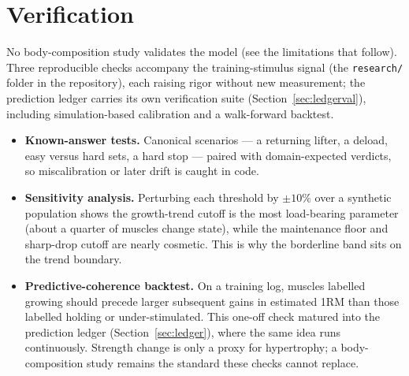 \documentclass[11pt,a4paper]{article}
\begin{document}
\section{Verification}\label{sec:verification}
No body-composition study validates the model (see the limitations that follow). Three reproducible checks accompany the training-stimulus signal (the \texttt{research/} folder in the repository), each raising rigor without new measurement; the prediction ledger carries its own verification suite (Section~\ref{sec:ledgerval}), including simulation-based calibration and a walk-forward backtest.
\begin{itemize}[leftmargin=*]
\item \textbf{Known-answer tests.} Canonical scenarios --- a returning lifter, a deload, easy versus hard sets, a hard stop --- paired with domain-expected verdicts, so miscalibration or later drift is caught in code.
\item \textbf{Sensitivity analysis.} Perturbing each threshold by $\pm 10\%$ over a synthetic population shows the growth-trend cutoff is the most load-bearing parameter (about a quarter of muscles change state), while the maintenance floor and sharp-drop cutoff are nearly cosmetic. This is why the borderline band sits on the trend boundary.
\item \textbf{Predictive-coherence backtest.} On a training log, muscles labelled growing should precede larger subsequent gains in estimated 1RM than those labelled holding or under-stimulated. This one-off check matured into the prediction ledger (Section~\ref{sec:ledger}), where the same idea runs continuously. Strength change is only a proxy for hypertrophy; a body-composition study remains the standard these checks cannot replace.
\end{itemize}
\end{document}
